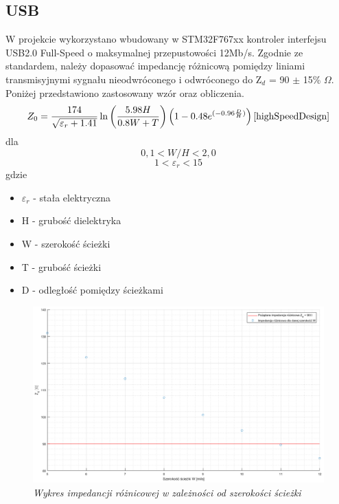 \documentclass[eng,printmode]{mgr}
\begin{document}
\subsection*{USB}
W projekcie wykorzystano wbudowany w STM32F767xx kontroler interfejsu USB2.0 Full-Speed o maksymalnej przepustowości 12Mb/s. Zgodnie ze standardem, należy dopasować impedancję różnicową pomiędzy liniami transmisyjnymi sygnału nieodwróconego i odwróconego do Z$_d$ = 90 $\pm$ 15\% $\Omega$\cite{usbSpec}. Poniżej przedstawiono zastosowany wzór oraz obliczenia.
\begin{equation}
Z_0= \frac{174}{\sqrt{\varepsilon_r + 1.41}}\ln{\left(\frac{5.98H}{0.8W + T}\right)} \left(1-0.48e^{(-0.96\frac{D}{H})}\right) \label{eq:usb_zd} \cite{highSpeedDesign}
\end{equation}
dla 
$$
0,1 < W/H < 2,0
$$
$$
1 < \varepsilon_r < 15
$$
gdzie
\begin{itemize}
  \item \textbf{$\varepsilon_r$} - stała elektryczna
  \item H - grubość dielektryka
  \item W - szerokość ścieżki
  \item T - grubość ścieżki
  \item D - odległość pomiędzy ścieżkami
\end{itemize}

\begin{figure}[!h]
    \centering
    \includegraphics[width=\textwidth]{plots/usbzD.png}
    \caption{\textit{Wykres impedancji różnicowej w zależności od szerokości ścieżki}}
\end{figure}
\end{document}

